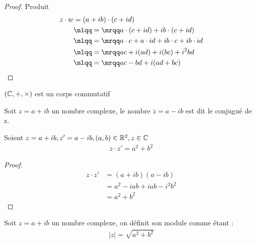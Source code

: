 \begin{proof}{Produit}
\begin{align*}
z \cdot w &= (a + ib) \cdot (c + id) \\
          &\mlqq=\mrqq a \cdot (c + id) + ib \cdot (c + id) \\
          &\mlqq=\mrqq a \cdot c + a \cdot id + ib \cdot c + ib \cdot id \\
          &\mlqq=\mrqq ac + i(ad) + i(bc) + i^2 bd \\
          &\mlqq=\mrqq ac - bd + i(ad + bc)
\end{align*}
\end{proof}


\begin{remarque}
    $(\mathbb{C}, +, \times)$ est un corps commutatif 
\end{remarque}



    \begin{definition}
    Soit $z = a + ib$ un nombre complexe, le nombre $\overline{z} = a - ib$ est dit le conjugué de z.
\end{definition}


\begin{proposition}{}
    Soient $z = a + ib, z'= a - ib, (a, b) \in \mathbb{R}^2, z \in \mathbb{C}$
    \begin{align*}
        z \cdot z' = a^2 + b^2 
    \end{align*}
\end{proposition}
\begin{proof}
        \begin{align*}
            z \cdot z' &= (a + ib)(a - ib) \\
                        &= a^2 -iab + iab -i^2b^2 \\
                        &= a^2 + b^2
        \end{align*}
    \end{proof}



    \begin{definition}
    Soit $z = a + ib$ un nombre complexe, on définit son module comme étant :
    \begin{align*}
        |z| = \sqrt{a^2 + b^2} 
    \end{align*}
\end{definition}



